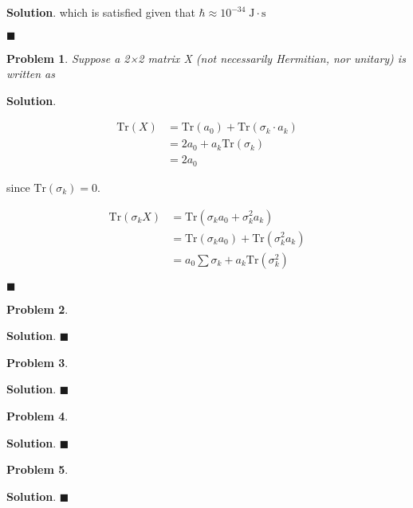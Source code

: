 \documentclass[12pt]{article}
\newtheorem{p}{Problem}
\theoremstyle{definition}
\newenvironment{s}{%
        \begin{trivlist} \item \textbf{Solution}. }{%
            \hspace*{\fill} $\blacksquare$\end{trivlist}}%
\begin{document}
{\begin{s}
which is satisfied given that $\hbar \approx 10^{-34} \;\mathrm{J\cdot s}$


\end{s}

\begin{p}
Suppose a 2×2 matrix X (not necessarily Hermitian, nor unitary) is written as
\end{p}

\begin{s} 


\begin{align*}
\mathrm{Tr}(X) &= \mathrm{Tr}(a_{0}) + \mathrm{Tr}(\sigma_{k}\cdot a_{k})\\
&= 2a_{0} + a_{k}\mathrm{Tr}(\sigma_{k})\\
&= 2a_{0}
\end{align*}

since $\mathrm{Tr}(\sigma_{k}) = 0$.

\begin{align*}
\mathrm{Tr}(\sigma_{k}X) &= \mathrm{Tr}\left(\sigma_{k}a_{0} + \sigma_{k}^{2}a_{k}\right)\\
&= \mathrm{Tr}\left(\sigma_{k}a_{0}\right) + \mathrm{Tr}\left(\sigma_{k}^{2}a_{k}\right)\\
&= a_{0}\sum\sigma_{k} + a_{k}\mathrm{Tr}\left(\sigma_{k}^{2}\right)
\end{align*}


\end{s}

\begin{p}

\end{p}

\begin{s} 
\end{s}

\begin{p}

\end{p}

\begin{s} 
\end{s}

\begin{p}

\end{p}

\begin{s} 
\end{s}

\begin{p}

\end{p}

\begin{s} 
\end{s}
\end{document}
